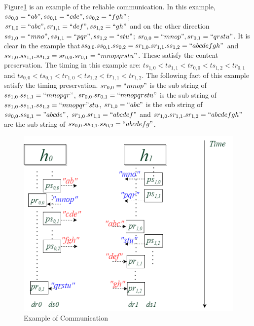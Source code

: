 Figure\ref{reliableexample} is an example of the reliable communication. In this example, $ss_{0,0}=``ab", ss_{0,1}=``cde",ss_{0,2}=``fgh"$; $sr_{1,0}=``abc", sr_{1,1}=``def", ss_{1,2}=``gh"$ and on the other direction $ss_{1,0}=``mno", ss_{1,1}=``pqr", ss_{1,2}=``stu"$; $sr_{0,0}=``mnop", sr_{0,1}=``qrstu"$. It is clear in the example that$ss_{0,0}.ss_{0,1}.ss_{0,2} = sr_{1,0}.sr_{1,1}.ss_{1,2} = ``abcdefgh"$ and $ss_{1,0}.ss_{1,1}.ss_{1,2} = sr_{0,0}.sr_{0,1}= ``mnopqrstu"$. These satisfy the content preservation. The timing in this example are: $ts_{1,0} < ts_{1,1} < tr_{0,0}< ts_{1,2} < tr_{0,1}$ and $ts_{0,0} < ts_{0,1} < tr_{1,0} < ts_{1,2} < tr_{1,1} < tr_{1,2}$. The following fact of this example satisfy the timing preservation. $sr_{0,0} = ``mnop"$ is the sub string of $ss_{1,0}.ss_{1,1} = ``mnopqr"$, $sr_{0,0}.sr_{0,1}=``mnopqrstu"$ is the sub string of $ss_{1,0}.ss_{1,1}.ss_{1,2} = ``mnopqr"stu$, $sr_{1,0}=``abc"$ is the sub string of $ss_{0,0}.ss_{0,1}="abcde"$, $sr_{1,0}.sr_{1,1}= ``abcdef"$ and $sr_{1,0}.sr_{1,1}.sr_{1,2} = ``abcdefgh"$ are the sub string of  $ss_{0,0}.ss_{0,1}.ss_{0,2} = ``abcdefg"$.
\begin{figure}[H]
\centerline{\includegraphics[scale=0.55]{Figures/reliableexample}}
\caption{Example of Communication}
\label{reliableexample}
\end{figure}

